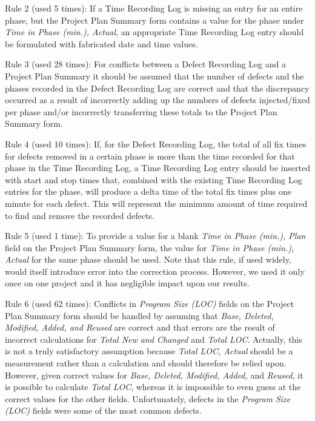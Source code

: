       
  Rule 2 (used 5 times): If a Time Recording Log is missing an entry for
  an entire phase, but the Project Plan Summary form contains a value for
  the phase under {\it Time in Phase (min.), Actual}, an appropriate Time
  Recording Log entry should be formulated with fabricated date and time
  values.
        
  Rule 3 (used 28 times): For conflicts between a Defect Recording Log and a Project Plan Summary
  it should be assumed that the number of defects and the phases recorded
  in the Defect Recording Log are correct and that the discrepancy occurred
  as a result of incorrectly adding up the numbers of defects
  injected/fixed per phase and/or incorrectly transferring these totals to
  the Project Plan Summary form.
      
  Rule 4 (used 10 times): If, for the Defect Recording Log, the total of
  all fix times for defects removed in a certain phase is more than the
  time recorded for that phase in the Time Recording Log, a Time Recording
  Log entry should be inserted with start and stop times that, combined
  with the existing Time Recording Log entries for the phase, will produce
  a delta time of the total fix times plus one minute for each defect.
  This will represent the minimum amount of time required to find and
  remove the recorded defects.
      
  Rule 5 (used 1 time): To provide a value for a blank {\it Time in Phase
    (min.), Plan} field on the Project Plan Summary form, the value for
  {\it Time in Phase (min.), Actual} for the same phase should be
  used. Note that this rule, if used widely, would itself introduce
  error into the correction process. However, we used it only once 
  on one project and it has negligible impact upon our results.
    
  Rule 6 (used 62 times): Conflicts in {\it Program Size (LOC)} fields on
  the Project Plan Summary form should be handled by assuming that {\it
    Base, Deleted, Modified, Added, and Reused} are correct and that errors
  are the result of incorrect calculations for {\it Total New and Changed}
  and {\it Total LOC}.  Actually, this is not a truly satisfactory
  assumption because {\it Total LOC, Actual} should be a measurement rather
  than a calculation and should therefore be relied upon.  However, given
  correct values for {\it Base, Deleted, Modified, Added,} and {\it
    Reused}, it is possible to calculate {\it Total LOC}, whereas it is
  impossible to even guess at the correct values for the other fields.
  Unfortunately, defects in the {\it Program Size (LOC)} fields were some
  of the most common defects.  



